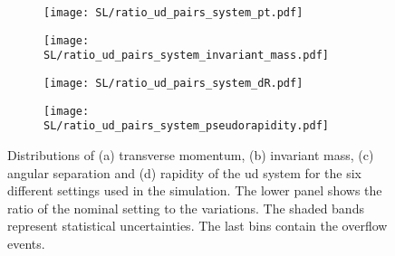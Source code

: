 \begin{figure}[H]
    \centering
    \begin{subfigure}{0.49\textwidth}
        \centering
        \texttt{[image: SL/ratio\_ud\_pairs\_system\_pt.pdf]}
        \caption{}
        \label{app:subfig:pt(ud)_SL}
    \end{subfigure}
    \begin{subfigure}{0.49\textwidth}
        \centering
        \texttt{[image: SL/ratio\_ud\_pairs\_system\_invariant\_mass.pdf]}
        \caption{}
        \label{app:subfig:m(ud)_SL}
    \end{subfigure}

    \vspace{0.2cm}
    
    \begin{subfigure}{0.49\textwidth}
        \centering
        \texttt{[image: SL/ratio\_ud\_pairs\_system\_dR.pdf]}
        \caption{}
        \label{app:subfig:dR(ud)_SL}
    \end{subfigure}
    \begin{subfigure}{0.49\textwidth}
        \centering
        \texttt{[image: SL/ratio\_ud\_pairs\_system\_pseudorapidity.pdf]}
        \caption{}
        \label{app:subfig:y(ud)_SL}
    \end{subfigure}
    \caption{Distributions of (a) transverse momentum, (b) invariant mass,  (c) angular separation and (d) rapidity of the ud system for the six different settings used in the simulation. The lower panel shows the ratio of the nominal setting to the variations. The shaded bands represent statistical uncertainties. The last bins contain the overflow events.}
    \label{app:fig:ud_SL}
\end{figure}

